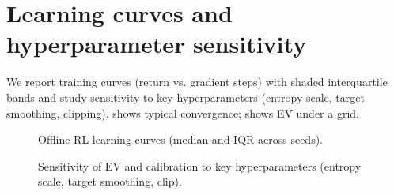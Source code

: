 \section{Learning curves and hyperparameter sensitivity}
We report training curves (return vs. gradient steps) with shaded interquartile bands and study sensitivity to key hyperparameters (entropy scale, target smoothing, clipping).  shows typical convergence;  shows EV under a grid.
\begin{figure}[t]
  \centering
  \caption{Offline RL learning curves (median and IQR across seeds).}
  \label{fig:rl-curves}
\end{figure}

\begin{figure}[t]
  \centering
  \caption{Sensitivity of EV and calibration to key hyperparameters (entropy scale, target smoothing, clip).}
  \label{fig:hparam-sens}
\end{figure}

